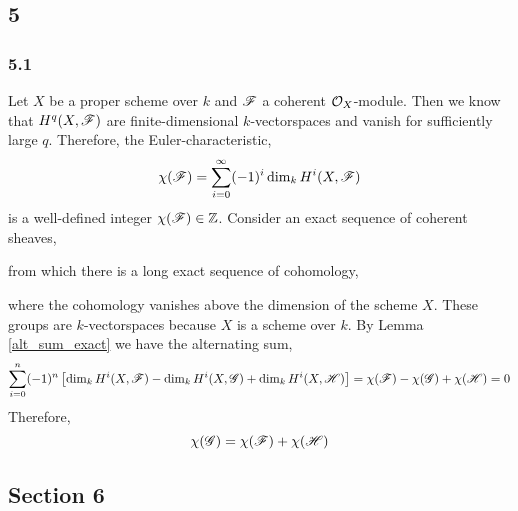 \documentclass[12pt]{article}
\begin{document}
\subsection{5}

\subsubsection{5.1}

Let $X$ be a proper scheme over $k$ and $\mathscr{F}$ a coherent $\mathcal{O}_{X}$-module. Then we know that $H^q(X, \mathscr{F})$ are finite-dimensional $k$-vectorspaces and vanish for sufficiently large $q$. Therefore, the Euler-characteristic,
\[ \chi(\mathscr{F}) = \sum_{i = 0}^\infty (-1)^i \dim_k H^i(X, \mathscr{F}) \]
is a well-defined integer $\chi(\mathscr{F}) \in \mathbb{Z}$. 
Consider an exact sequence of coherent sheaves,  
\begin{center}
\end{center}
from which there is a long exact sequence of cohomology,
\begin{center}
\end{center}
where the cohomology vanishes above the dimension of the scheme $X$. These groups are $k$-vectorspaces because $X$ is a scheme over $k$. By Lemma \ref{alt_sum_exact} we have the alternating sum,
\begin{align*}
\sum_{i = 0}^n (-1)^n \left[ \dim_k H^i(X, \mathscr{F}) - \dim_k H^i(X, \mathscr{G}) + \dim_k H^i(X, \mathscr{H}) \right] = \chi(\mathscr{F}) - \chi(\mathscr{G}) + \chi(\mathscr{H}) = 0  
\end{align*}
Therefore,
\[ \chi(\mathscr{G}) = \chi(\mathscr{F}) + \chi(\mathscr{H}) \]


\subsection{Section 6}
\end{document}
